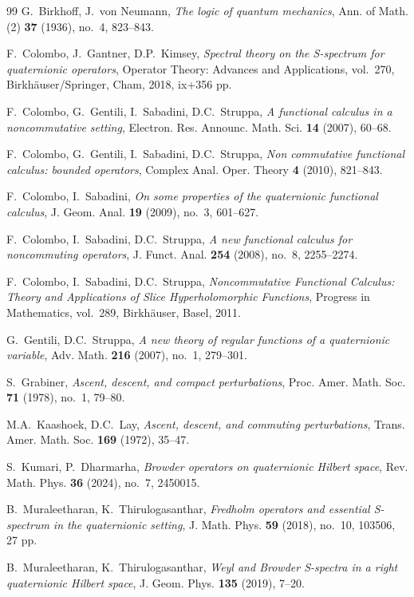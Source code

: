 \documentclass[11pt,a4paper]{article}
\theoremstyle{plain}
\theoremstyle{remark}
\begin{document}
\begin{thebibliography}{99}
 G.~Birkhoff, J.~von Neumann, \emph{The logic of quantum mechanics}, Ann. of Math. (2) \textbf{37} (1936), no.~4, 823--843.

 F.~Colombo, J.~Gantner, D.P.~Kimsey, \emph{Spectral theory on the S-spectrum for quaternionic operators}, Operator Theory: Advances and Applications, vol.~270, Birkhäuser/Springer, Cham, 2018, ix+356 pp.

 F.~Colombo, G.~Gentili, I.~Sabadini, D.C.~Struppa, \emph{A functional calculus in a noncommutative setting}, Electron. Res. Announc. Math. Sci. \textbf{14} (2007), 60--68.

 F.~Colombo, G.~Gentili, I.~Sabadini, D.C.~Struppa, \emph{Non commutative functional calculus: bounded operators}, Complex Anal. Oper. Theory \textbf{4} (2010), 821--843.

 F.~Colombo, I.~Sabadini, \emph{On some properties of the quaternionic functional calculus}, J. Geom. Anal. \textbf{19} (2009), no.~3, 601--627.

 F.~Colombo, I.~Sabadini, D.C.~Struppa, \emph{A new functional calculus for noncommuting operators}, J. Funct. Anal. \textbf{254} (2008), no.~8, 2255--2274.

 F.~Colombo, I.~Sabadini, D.C.~Struppa, \emph{Noncommutative Functional Calculus: Theory and Applications of Slice Hyperholomorphic Functions}, Progress in Mathematics, vol.~289, Birkhäuser, Basel, 2011.

 G.~Gentili, D.C.~Struppa, \emph{A new theory of regular functions of a quaternionic variable}, Adv. Math. \textbf{216} (2007), no.~1, 279--301.

 S.~Grabiner, \emph{Ascent, descent, and compact perturbations}, Proc. Amer. Math. Soc. \textbf{71} (1978), no.~1, 79--80.

 M.A.~Kaashoek, D.C.~Lay, \emph{Ascent, descent, and commuting perturbations}, Trans. Amer. Math. Soc. \textbf{169} (1972), 35--47.

 S.~Kumari, P.~Dharmarha, \emph{Browder operators on quaternionic Hilbert space}, Rev. Math. Phys. \textbf{36} (2024), no.~7, 2450015.

 B.~Muraleetharan, K.~Thirulogasanthar, \emph{Fredholm operators and essential S-spectrum in the quaternionic setting}, J. Math. Phys. \textbf{59} (2018), no.~10, 103506, 27 pp.

 B.~Muraleetharan, K.~Thirulogasanthar, \emph{Weyl and Browder S-spectra in a right quaternionic Hilbert space}, J. Geom. Phys. \textbf{135} (2019), 7--20.

\end{thebibliography}
\end{document}
